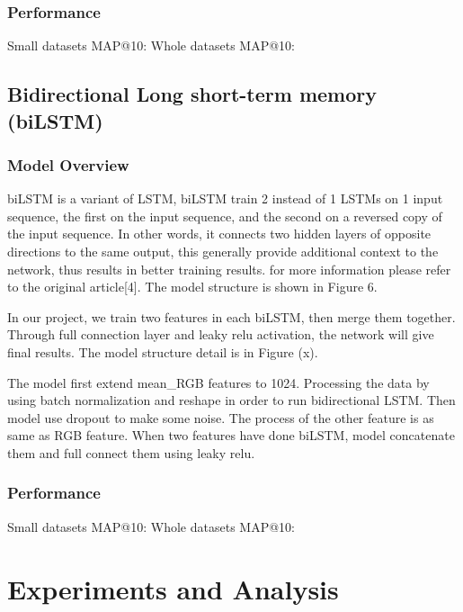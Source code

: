 \documentclass{article}
\begin{document}
\subsubsection{Performance}
Small datasets MAP@10: 
Whole datasets MAP@10: 

\subsection{Bidirectional Long short-term memory (biLSTM)}
\subsubsection{Model Overview}
biLSTM is a variant of LSTM, biLSTM train 2 instead of 1 LSTMs on 1 input sequence, the first on the input sequence, and the second on a reversed copy of the input sequence. In other words, it connects two hidden layers of opposite directions to the same output, this generally provide additional context to the network, thus results in better training results. for more information please refer to the original article[4]. The model structure is shown in Figure 6.


In our project, we train two features in each biLSTM, then merge them together. Through full connection layer and leaky relu activation, the network will give final results. The model structure detail is in Figure (x).

The model first extend mean\_RGB features to 1024. Processing the data by using batch normalization and reshape in order to run bidirectional LSTM. Then model use dropout to make some noise. The process of the other feature is as same as RGB feature. When two features have done biLSTM, model concatenate them and full connect them using leaky relu. 

\subsubsection{Performance}
Small datasets MAP@10: 
Whole datasets MAP@10: 


\section{Experiments and Analysis}
\end{document}
